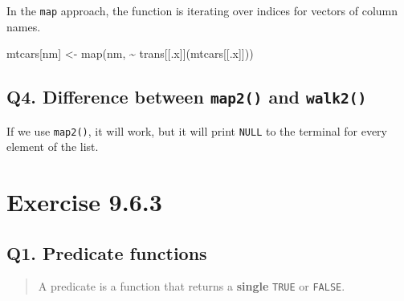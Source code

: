 \documentclass[
]{book}
\newenvironment{Shaded}{\begin{snugshade}}{\end{snugshade}}
\newcommand{\FunctionTok}[1]{\textcolor[rgb]{0.00,0.00,0.00}{#1}}
\newcommand{\NormalTok}[1]{#1}
\newcommand{\OtherTok}[1]{\textcolor[rgb]{0.56,0.35,0.01}{#1}}
\newcommand{\SpecialCharTok}[1]{\textcolor[rgb]{0.00,0.00,0.00}{#1}}
\begin{document}
In the \texttt{map} approach, the function is iterating over indices for vectors of column names.

\begin{Shaded}
\begin{Highlighting}[]
\NormalTok{mtcars[nm] }\OtherTok{\textless{}{-}} \FunctionTok{map}\NormalTok{(nm, }\SpecialCharTok{\textasciitilde{}}\NormalTok{ trans[[.x]](mtcars[[.x]]))}
\end{Highlighting}
\end{Shaded}

\hypertarget{q4.-difference-between-map2-and-walk2}{%
\subsection*{\texorpdfstring{Q4. Difference between \texttt{map2()} and \texttt{walk2()}}{Q4. Difference between map2() and walk2()}}\label{q4.-difference-between-map2-and-walk2}}

If we use \texttt{map2()}, it will work, but it will print \texttt{NULL} to the terminal for every element of the list.

\begin{Shaded}
\end{Shaded}

\hypertarget{exercise-9.6.3}{%
\section{Exercise 9.6.3}\label{exercise-9.6.3}}

\hypertarget{q1.-predicate-functions}{%
\subsection*{Q1. Predicate functions}\label{q1.-predicate-functions}}

\begin{quote}
A predicate is a function that returns a \textbf{single} \texttt{TRUE} or \texttt{FALSE}.
\end{quote}
\end{document}
